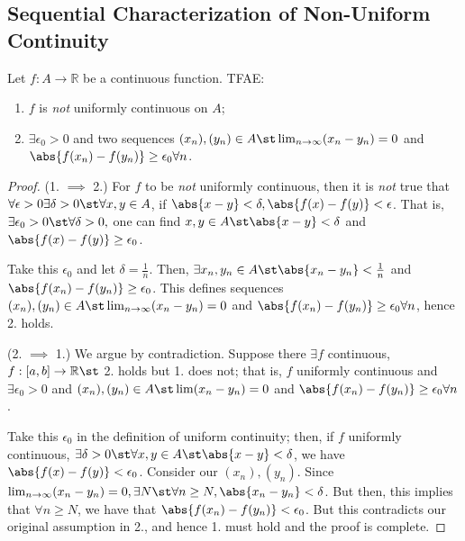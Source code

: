 \documentclass[12pt]{article}
\begin{document}
\subsection{Sequential Characterization of Non-Uniform Continuity}

\begin{theorem}
  Let $f: A \to \mathbb{R}$ be a continuous function. TFAE:
  \begin{enumerate}
    \item $f$ is \emph{not} uniformly continuous on $A$;
    \item $\exists \epsilon_0 > 0$ and two sequences $(x_n), (y_n) \in A \st \lim_{n\to\infty} (x_n - y_n) = 0$ and $\abs{f(x_n) - f(y_n)} \geq \epsilon_0 \forall n$.
  \end{enumerate}
\end{theorem}

\begin{proof}
  (1. $\implies$ 2.) For $f$ to be \emph{not} uniformly continuous, then it is \emph{not} true that $\forall \epsilon > 0 \exists \delta > 0 \st \forall x, y \in A$, if $\abs{x - y} < \delta, \abs{f(x) - f(y)} < \epsilon$. That is, $\exists \epsilon_0 > 0 \st \forall \delta > 0,$ one can find $x, y \in A \st \abs{x - y} < \delta$ and $\abs{f(x) - f(y)} \geq \epsilon_0$. 
  
  Take this $\epsilon_0$ and let $\delta = \frac{1}{n}$. Then, $\exists x_n, y_n \in A \st \abs{x_n - y_n} < \frac{1}{n}$ and $\abs{f(x_n) - f(y_n)} \geq \epsilon_0$. This defines sequences $(x_n), (y_n) \in A \st \lim_{n\to\infty} (x_n - y_n) = 0$ and $\abs{f(x_n) - f(y_n)} \geq \epsilon_0 \forall n$, hence 2. holds.

  \noindent (2. $\implies$ 1.) We argue by contradiction. Suppose there $\exists f$ continuous, $f: [a, b] \to \mathbb{R} \st$ 2. holds but 1. does not; that is, $f$ uniformly continuous and $\exists \epsilon_0 > 0$ and $(x_n), (y_n) \in A \st \lim (x_n - y_n) = 0$ and $\abs{f(x_n) - f(y_n)} \geq \epsilon_0 \forall n$.

  Take this $\epsilon_0$ in the definition of uniform continuity; then, if $f$ uniformly continuous, $\exists \delta > 0 \st \forall x, y\in A \st \abs{x - y} < \delta$, we have $\abs{f(x) - f(y)} < \epsilon_0$. Consider our $(x_n), (y_n)$. Since $\lim_{n\to\infty} (x_n - y_n) = 0, \exists N \st \forall n \geq N, \abs{x_n - y_n} < \delta$. But then, this implies that $\forall n \geq N$, we have that $\abs{f(x_n) - f(y_n)} < \epsilon_0$. But this contradicts our original assumption in 2., and hence 1. must hold and the proof is complete.
\end{proof}
\end{document}
